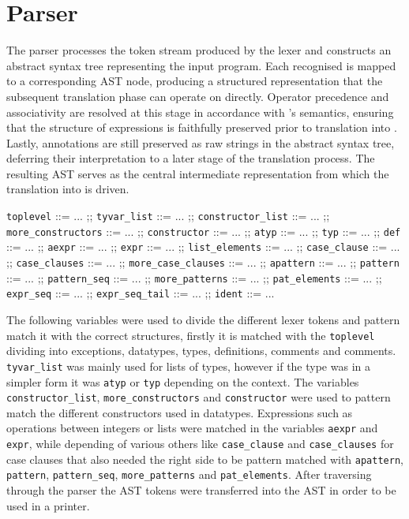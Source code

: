 \section{Parser}
\label{sec:Parser}

The parser processes the token stream produced by the lexer and constructs an abstract syntax tree representing the input program. Each recognised 
is mapped to a corresponding AST node, producing a structured representation that the subsequent translation phase can operate on directly. 
Operator precedence and associativity are resolved at this stage in accordance with \cml's semantics, ensuring that the structure of expressions 
is faithfully preserved prior to translation into \whyml. Lastly, \gospel annotations are still preserved as raw strings in the abstract syntax tree, 
deferring their interpretation to a later stage of the translation process. The resulting AST serves as the central intermediate representation 
from which the translation into \whyml is driven.

\begin{center}
\begin{bnf}
\texttt{toplevel} ::= ... ;;
\texttt{tyvar\_list} ::= ... ;;
\texttt{constructor\_list} ::= ... ;;
\texttt{more\_constructors} ::= ... ;;
\texttt{constructor} ::= ... ;;
\texttt{atyp} ::= ... ;;
\texttt{typ} ::= ... ;;
\texttt{def} ::= ... ;;
\texttt{aexpr} ::= ... ;;
\texttt{expr} ::= ... ;;
\texttt{list\_elements} ::= ... ;;
\texttt{case\_clause} ::= ... ;;
\texttt{case\_clauses} ::= ... ;;
\texttt{more\_case\_clauses} ::= ... ;;
\texttt{apattern} ::= ... ;;
\texttt{pattern} ::= ... ;;
\texttt{pattern\_seq} ::= ... ;;
\texttt{more\_patterns} ::= ... ;;
\texttt{pat\_elements} ::= ... ;;
\texttt{expr\_seq} ::= ... ;;
\texttt{expr\_seq\_tail} ::= ... ;;
\texttt{ident} ::= ...
\end{bnf}
\end{center}

The following variables were used to divide the different lexer tokens and pattern match it with the correct structures, firstly it is matched
with the \texttt{toplevel} dividing into exceptions, datatypes, types, definitions, comments and \gospel comments. \texttt{tyvar\_list} was mainly
used for lists of types, however if the type was in a simpler form it was \texttt{atyp} or \texttt{typ} depending on the context. The variables 
\texttt{constructor\_list}, \texttt{more\_constructors} and \texttt{constructor} were used to pattern match the different constructors used in
datatypes. Expressions such as operations between integers or lists were matched in the variables \texttt{aexpr} and \texttt{expr}, while depending
of various others like \texttt{case\_clause} and \texttt{case\_clauses} for case clauses that also needed the right side to be pattern matched with 
\texttt{apattern}, \texttt{pattern}, \texttt{pattern\_seq}, \texttt{more\_patterns} and \texttt{pat\_elements}. After traversing through the parser
the AST tokens were transferred into the AST in order to be used in a printer.


